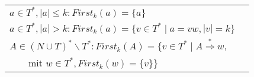 \documentclass[
    border=0.2cm,
    convert={density=600}
]{standalone}
\begin{document}
	\begin{tabular}{lp{11 cm}}
$a \in T^*, |a| \leq k: {First}_k (a) = \lbrace a\rbrace$\\
$a \in T^*, |a| > k: {First}_k (a) = \lbrace v \in T^* \mid a = vw, |v| = k\rbrace$\\
$A \in (N \cup T)^* \backslash T^*: {First}_k (A) = \lbrace v \in T^* \mid  A \overset{*}{\Rightarrow} w,$\\
\ \ \ \ mit $w \in T^*, First_k(w) = \lbrace  v \rbrace\rbrace$
\end{tabular}
\end{document}
